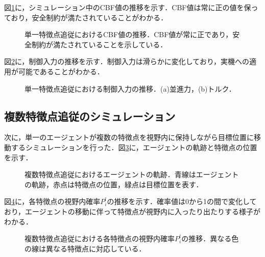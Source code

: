 図\ref{fig:single_feature_cbf_value}に，シミュレーション中のCBF値の推移を示す．CBF値は常に正の値を保っており，安全制約が満たされていることがわかる．

\begin{figure}[htbp]
    \centering
    \caption{単一特徴点追従におけるCBF値の推移．CBF値が常に正であり，安全制約が満たされていることを示している．}
    \label{fig:single_feature_cbf_value}
\end{figure}

図\ref{fig:single_feature_control_input}に，制御入力の推移を示す．制御入力は滑らかに変化しており，実機への適用が可能であることがわかる．

\begin{figure}[htbp]
    \centering
    \caption{単一特徴点追従における制御入力の推移．(a)並進力，(b)トルク．}
    \label{fig:single_feature_control_input}
\end{figure}

\subsection{複数特徴点追従のシミュレーション}

次に，単一のエージェントが複数の特徴点を視野内に保持しながら目標位置に移動するシミュレーションを行った．図\ref{fig:multi_feature_trajectory}に，エージェントの軌跡と特徴点の位置を示す．

\begin{figure}[htbp]
    \centering
    \caption{複数特徴点追従におけるエージェントの軌跡．青線はエージェントの軌跡，赤点は特徴点の位置，緑点は目標位置を表す．}
    \label{fig:multi_feature_trajectory}
\end{figure}

図\ref{fig:multi_feature_probability}に，各特徴点の視野内確率$P_i^l$の推移を示す．確率値は0から1の間で変化しており，エージェントの移動に伴って特徴点が視野内に入ったり出たりする様子がわかる．

\begin{figure}[htbp]
    \centering
    \caption{複数特徴点追従における各特徴点の視野内確率$P_i^l$の推移．異なる色の線は異なる特徴点に対応している．}
    \label{fig:multi_feature_probability}
\end{figure}

